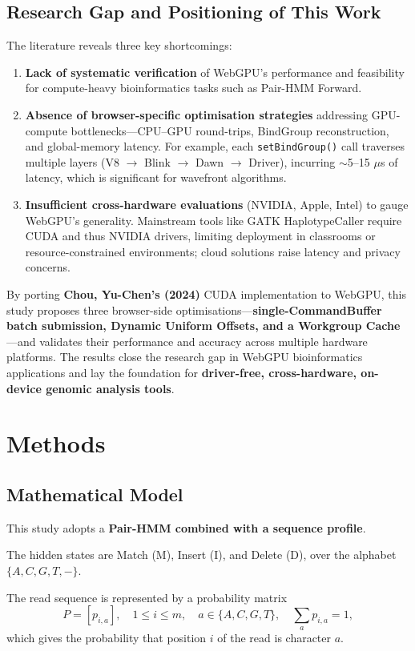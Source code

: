 \documentclass[PhD]{PHlab-thesis}
\begin{document}
\section{Research Gap and Positioning of This Work}
The literature reveals three key shortcomings:
\begin{enumerate}
    \item \textbf{Lack of systematic verification} of WebGPU’s performance and feasibility for compute-heavy bioinformatics tasks such as Pair-HMM Forward.
    \item \textbf{Absence of browser-specific optimisation strategies} addressing GPU-compute bottlenecks—CPU–GPU round-trips, BindGroup reconstruction, and global-memory latency. For example, each \texttt{setBindGroup()} call traverses multiple layers (V8 $\rightarrow$ Blink $\rightarrow$ Dawn $\rightarrow$ Driver), incurring $\sim$5–15 $\mu$s of latency, which is significant for wavefront algorithms.
    \item \textbf{Insufficient cross-hardware evaluations} (NVIDIA, Apple, Intel) to gauge WebGPU’s generality. Mainstream tools like GATK HaplotypeCaller require CUDA and thus NVIDIA drivers, limiting deployment in classrooms or resource-constrained environments; cloud solutions raise latency and privacy concerns.
\end{enumerate}
By porting \textbf{Chou, Yu-Chen’s (2024)} CUDA implementation to WebGPU, this study proposes three browser-side optimisations—\textbf{single-CommandBuffer batch submission, Dynamic Uniform Offsets, and a Workgroup Cache}—and validates their performance and accuracy across multiple hardware platforms. The results close the research gap in WebGPU bioinformatics applications and lay the foundation for \textbf{driver-free, cross-hardware, on-device genomic analysis tools}.



\chapter{Methods}
\section{Mathematical Model}
This study adopts a \textbf{Pair-HMM combined with a sequence profile}.

The hidden states are Match (M), Insert (I), and Delete (D), over the alphabet $\{A,C,G,T,-\}$.

The read sequence is represented by a probability matrix
\[
P = [p_{i,a}], \quad 1 \leq i \leq m, \quad a \in \{A,C,G,T\}, \quad \sum_a p_{i,a} = 1,
\]
which gives the probability that position $i$ of the read is character $a$.
\end{document}
